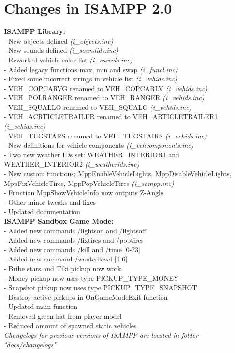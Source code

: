 \documentclass{article}
\begin{document}
\section{Changes in ISAMPP 2.0}
\textbf{ISAMPP Library:}
\\- New objects defined \textit{(i\_objects.inc)}
\\- New sounds defined \textit{(i\_soundids.inc)}
\\- Reworked vehicle color list \textit{(i\_carcols.inc)}
\\- Added legacy functions max, min and swap \textit{(i\_funcl.inc)}
\\- Fixed some incorrect strings in vehicle list \textit{(i\_vehids.inc)}
\\- VEH\_COPCARVG renamed to VEH\_COPCARLV \textit{(i\_vehids.inc)}
\\- VEH\_POLRANGER renamed to VEH\_RANGER \textit{(i\_vehids.inc)}
\\- VEH\_SQUALLO renamed to VEH\_SQUALO \textit{(i\_vehids.inc)}
\\- VEH\_ACRTICLETRAILER renamed to VEH\_ARTICLETRAILER1 \textit{(i\_vehids.inc)}
\\- VEH\_TUGSTARS renamed to VEH\_TUGSTAIRS \textit{(i\_vehids.inc)}
\\- New definitions for vehicle components \textit{(i\_vehcomponents.inc)}
\\- Two new weather IDs set: WEATHER\_INTERIOR1 and WEATHER\_INTERIOR2 \textit{(i\_weatherids.inc)}
\\- New custom functions: MppEnableVehicleLights, MppDisableVehicleLights, MppFixVehicleTires, MppPopVehicleTires \textit{(i\_sampp.inc)}
\\- Function MppShowVehicleInfo now outputs Z-Angle
\\- Other minor tweaks and fixes
\\- Updated documentation
\bigskip
\\\textbf{ISAMPP Sandbox Game Mode:}
\\- Added new commands /lightson and /lightsoff
\\- Added new commands /fixtires and /poptires
\\- Added new commands /kill and /time [0-23]
\\- Added new command /wantedlevel [0-6]
\\- Bribe stars and Tiki pickup now work
\\- Money pickup now uses type PICKUP\_TYPE\_MONEY
\\- Snapshot pickup now uses type PICKUP\_TYPE\_SNAPSHOT
\\- Destroy active pickups in OnGameModeExit function
\\- Updated main function
\\- Removed green hat from player model
\\- Reduced amount of spawned static vehicles
\bigskip
\\\textit{Changelogs for previous versions of ISAMPP are located in folder "docs/changelogs"}
\end{document}
